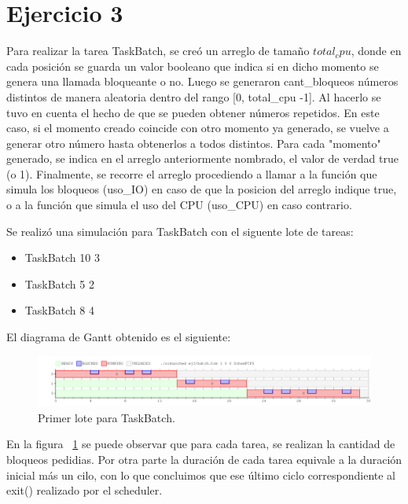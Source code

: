 \section{Ejercicio 3}

Para realizar la tarea TaskBatch, se creó un arreglo de tamaño $total_cpu$, donde en cada posición se guarda un valor booleano que indica si en dicho momento se genera una llamada bloqueante o no. Luego se generaron cant_bloqueos números distintos de manera aleatoria dentro del rango [0, total_cpu -1]. Al hacerlo se tuvo en cuenta el hecho de que se pueden obtener números repetidos.
En este caso, si el momento creado coincide con otro momento ya generado, se vuelve a generar otro número hasta obtenerlos a todos distintos. Para cada "momento" generado, se indica en el arreglo anteriormente nombrado, el valor de verdad true (o 1).
Finalmente, se recorre el arreglo procediendo a llamar a la función que simula los bloqueos (uso_IO) en caso de que la posicion del arreglo indique true, o a la función que simula el uso del CPU (uso_CPU) en caso contrario.

Se realizó una simulación para TaskBatch con el siguente lote de tareas:

\begin{itemize}

\item TaskBatch 10 3
\item TaskBatch 5 2
\item TaskBatch 8 4

\end{itemize}

El diagrama de Gantt obtenido es el siguiente:

\begin{figure}[h]
  \includegraphics[width=\textwidth]{../ej3/salida.png}
  \caption{Primer lote para TaskBatch.}
  \label{fig:primera}
\end{figure}


En la figura ~\ref{fig:primera} se puede observar que para cada tarea, se realizan la cantidad de bloqueos pedidias. Por otra parte la duración de cada tarea equivale a la duración inicial más un cilo, con lo que concluimos que ese último ciclo correspondiente al exit() realizado por el scheduler.\\


